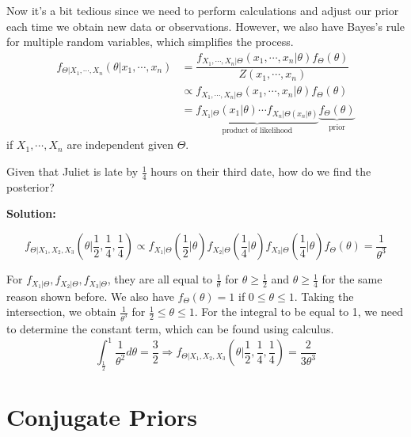Now it's a bit tedious since we need to perform calculations and adjust our prior each time we obtain new data or observations. However, we also have Bayes's rule for multiple random variables, which simplifies the process. 
\[
  \begin{aligned}
    f_{\Theta \vert X_1, \cdots, X_n} (\theta \vert x_1, \cdots, x_n) &= \dfrac{f_{X_1, \cdots, X_n \vert \Theta} (x_1, \cdots, x_n \vert \theta) f_{\Theta} (\theta)}{Z(x_1, \cdots, x_n)} \\
    &\propto f_{X_1, \cdots, X_n \vert \Theta} (x_1, \cdots, x_n \vert \theta) f_{\Theta} (\theta) \\ 
    &= \underbrace{f_{X_1 \vert \Theta} (x_1 \vert \theta) \cdots f_{X_n  \vert \Theta(x_n \vert \theta)}}_{\text{product of likelihood}} \underbrace{f_{\Theta} (\theta)}_{\text{prior}}
  \end{aligned}
\]
if \(X_1, \cdots, X_n\) are independent given \(\Theta\).  

\begin{eg}[Cont'd]
  Given that Juliet is late by \(\frac{1}{4}\) hours on their third date, how do we find the posterior? 

  \textbf{Solution:} 

  \[
    f_{\Theta \vert X_1, X_2, X_3} \left(\theta \Big| \dfrac{1}{2}, \dfrac{1}{4}, \dfrac{1}{4}\right) \propto f_{X_1 \vert \Theta} \left(\dfrac{1}{2} \Big| \theta\right) f_{X_2 \vert \Theta} \left(\dfrac{1}{4} \Big| \theta\right) f_{X_3 \vert \Theta} \left(\dfrac{1}{4} \Big| \theta\right) f_{\Theta} (\theta) = \dfrac{1}{\theta^3}
  \]

  For \(f_{X_1 \vert \Theta}, f_{X_2 \vert \Theta}, f_{X_3 \vert \Theta}\), they are all equal to \(\frac{1}{\theta}\) for \(\theta \geq \frac{1}{2}\) and \(\theta \geq \frac{1}{4}\) for the same reason shown before. We also have \(f_{\Theta} (\theta) = 1\) if \(0 \leq \theta \leq 1\). Taking the intersection, we obtain \(\frac{1}{\theta^3}\) for \(\frac{1}{2} \leq \theta \leq 1\). For the integral to be equal to 1, we need to determine the constant term, which can be found using calculus.
  \[
    \int_\frac{1}{2} ^1 \dfrac{1}{\theta^2} d \theta = \dfrac{3}{2} \Longrightarrow f_{\Theta \vert X_1, X_2, X_3} \left(\theta \Big| \dfrac{1}{2}, \dfrac{1}{4}, \dfrac{1}{4}\right) = \dfrac{2}{3\theta^3}
  \]  
\end{eg}

\section{Conjugate Priors}